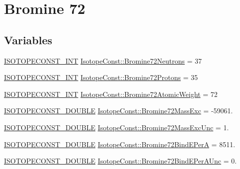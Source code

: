\hypertarget{group___isotope_const-_bromine-_br72}{}\section{Bromine 72}
\label{group___isotope_const-_bromine-_br72}
\subsection*{Variables}
\begin{DoxyCompactItemize}
\item 
\mbox{\hyperlink{group___isotope_const-_macros_ga5f18360b3e99483a35c32d789e62621c}{I\+S\+O\+T\+O\+P\+E\+C\+O\+N\+S\+T\+\_\+\+I\+NT}} \mbox{\hyperlink{group___isotope_const-_bromine-_br72_ga1325f68c10684b2012f23258f4c591f7}{Isotope\+Const\+::\+Bromine72\+Neutrons}} = 37
\item 
\mbox{\hyperlink{group___isotope_const-_macros_ga5f18360b3e99483a35c32d789e62621c}{I\+S\+O\+T\+O\+P\+E\+C\+O\+N\+S\+T\+\_\+\+I\+NT}} \mbox{\hyperlink{group___isotope_const-_bromine-_br72_ga6852269144d02469f66b3c8383e50578}{Isotope\+Const\+::\+Bromine72\+Protons}} = 35
\item 
\mbox{\hyperlink{group___isotope_const-_macros_ga5f18360b3e99483a35c32d789e62621c}{I\+S\+O\+T\+O\+P\+E\+C\+O\+N\+S\+T\+\_\+\+I\+NT}} \mbox{\hyperlink{group___isotope_const-_bromine-_br72_ga39798ccc235ce920a8adc406016a6920}{Isotope\+Const\+::\+Bromine72\+Atomic\+Weight}} = 72
\item 
\mbox{\hyperlink{group___isotope_const-_macros_ga8f45a7272ce02c0b4c65c44636ed719a}{I\+S\+O\+T\+O\+P\+E\+C\+O\+N\+S\+T\+\_\+\+D\+O\+U\+B\+LE}} \mbox{\hyperlink{group___isotope_const-_bromine-_br72_gab877fe3005f93a145760225d2d37554b}{Isotope\+Const\+::\+Bromine72\+Mass\+Exc}} = -\/59061.
\item 
\mbox{\hyperlink{group___isotope_const-_macros_ga8f45a7272ce02c0b4c65c44636ed719a}{I\+S\+O\+T\+O\+P\+E\+C\+O\+N\+S\+T\+\_\+\+D\+O\+U\+B\+LE}} \mbox{\hyperlink{group___isotope_const-_bromine-_br72_gab58a8475458b4f98dd11c4502ed4babe}{Isotope\+Const\+::\+Bromine72\+Mass\+Exc\+Unc}} = 1.
\item 
\mbox{\hyperlink{group___isotope_const-_macros_ga8f45a7272ce02c0b4c65c44636ed719a}{I\+S\+O\+T\+O\+P\+E\+C\+O\+N\+S\+T\+\_\+\+D\+O\+U\+B\+LE}} \mbox{\hyperlink{group___isotope_const-_bromine-_br72_gaade739c758e1b9f8e3e4a6c0aaee6b7f}{Isotope\+Const\+::\+Bromine72\+Bind\+E\+PerA}} = 8511.
\item 
\mbox{\hyperlink{group___isotope_const-_macros_ga8f45a7272ce02c0b4c65c44636ed719a}{I\+S\+O\+T\+O\+P\+E\+C\+O\+N\+S\+T\+\_\+\+D\+O\+U\+B\+LE}} \mbox{\hyperlink{group___isotope_const-_bromine-_br72_ga01aa41edf3167c15a66292bf739a4628}{Isotope\+Const\+::\+Bromine72\+Bind\+E\+Per\+A\+Unc}} = 0.

\end{DoxyCompactItemize}
